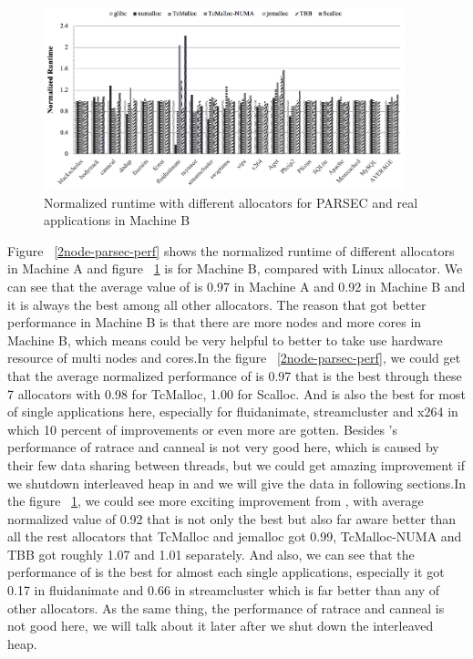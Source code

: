 \begin{figure}[H]
    \centering
    \includegraphics[width=\textwidth,height=200]{figure/8-node-parsec-perf.png}
    \caption{Normalized runtime with different allocators for PARSEC and real applications in Machine B}
    \label{8node-parsec-perf}
\end{figure}

Figure ~\ref{2node-parsec-perf} shows the normalized runtime of different allocators in Machine A and figure ~\ref{8node-parsec-perf} is for Machine B, compared with Linux allocator. We can see that the average value of \NM{} is 0.97 in Machine A and 0.92 in Machine B and it is always the best among all other allocators. The reason that \NM{} got better performance in Machine B is that there are more nodes and more cores in Machine B, which means \NM{} could be very helpful to better to take use hardware resource of multi nodes and cores.In the figure ~\ref{2node-parsec-perf}, we could get that the average normalized performance of \NM{} is 0.97 that is the best through these 7 allocators with 0.98 for TcMalloc, 1.00 for Scalloc. And \NM{} is also the best for most of single applications here, especially for fluidanimate, streamcluster and x264 in which 10 percent of improvements or even more are gotten. Besides \NM{}'s performance of  ratrace and canneal is not very good here, which is caused by their few data sharing between threads, but we could get amazing improvement if we shutdown interleaved heap in \NM{} and we will give the data in following sections.In the figure ~\ref{8node-parsec-perf}, we could see more exciting improvement from \NM{}, with average normalized value of 0.92 that is not only the best but also far aware better than all the rest allocators that TcMalloc and jemalloc got 0.99, TcMalloc-NUMA and TBB got roughly 1.07 and 1.01 separately. And also, we can see that the performance of \NM{} is the best for almost each single applications, especially it got 0.17 in fluidanimate and 0.66 in streamcluster which is far better than any of other allocators. As the same thing, the performance of ratrace and canneal is not good here, we will talk about it later after we shut down the interleaved heap.

